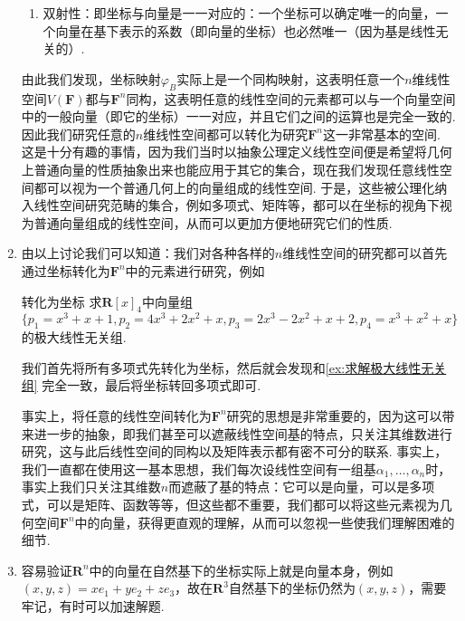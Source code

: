 \begin{enumerate}
\begin{enumerate}
              \item 双射性：即坐标与向量是一一对应的：一个坐标可以确定唯一的向量，一个向量在基下表示的系数（即向量的坐标）也必然唯一（因为基是线性无关的）.
          \end{enumerate}
          由此我们发现，坐标映射$\varphi_B$实际上是一个同构映射，这表明任意一个$n$维线性空间$V(\mathbf{F})$都与$\mathbf{F}^n$同构，这表明任意的线性空间的元素都可以与一个向量空间中的一般向量（即它的坐标）一一对应，并且它们之间的运算也是完全一致的. 因此我们研究任意的$n$维线性空间都可以转化为研究$\mathbf{F}^n$这一非常基本的空间. 这是十分有趣的事情，因为我们当时以抽象公理定义线性空间便是希望将几何上普通向量的性质抽象出来也能应用于其它的集合，现在我们发现任意线性空间都可以视为一个普通几何上的向量组成的线性空间. 于是，这些被公理化纳入线性空间研究范畴的集合，例如多项式、矩阵等，都可以在坐标的视角下视为普通向量组成的线性空间，从而可以更加方便地研究它们的性质.

    \item 由以上讨论我们可以知道：我们对各种各样的$n$维线性空间的研究都可以首先通过坐标转化为$\mathbf{F}^n$中的元素进行研究，例如
          \begin{example}{}{转化为坐标}
              求$\mathbf{R}[x]_4$中向量组$\{p_1=x^3+x+1,p_2=4x^3+2x^2+x,p_3=2x^3-2x^2+x+2,p_4=x^3+x^2+x\}$的极大线性无关组.
          \end{example}
          \begin{solution}
              我们首先将所有多项式先转化为坐标，然后就会发现和\autoref{ex:求解极大线性无关组} 完全一致，最后将坐标转回多项式即可.
          \end{solution}

          事实上，将任意的线性空间转化为$\mathbf{F}^n$研究的思想是非常重要的，因为这可以带来进一步的抽象，即我们甚至可以遮蔽线性空间基的特点，只关注其维数进行研究，这与此后线性空间的同构以及矩阵表示都有密不可分的联系. 事实上，我们一直都在使用这一基本思想，我们每次设线性空间有一组基$\alpha_1,\ldots,\alpha_n$时，事实上我们只关注其维数$n$而遮蔽了基的特点：它可以是向量，可以是多项式，可以是矩阵、函数等等，但这些都不重要，我们都可以将这些元素视为几何空间$\mathbf{F}^n$中的向量，获得更直观的理解，从而可以忽视一些使我们理解困难的细节.

    \item 容易验证$\mathbf{R}^n$中的向量在自然基下的坐标实际上就是向量本身，例如$(x,y,z)=xe_1+ye_2+ze_3$，故在$\mathbf{R}^3$自然基下的坐标仍然为$(x,y,z)$，需要牢记，有时可以加速解题.
\end{enumerate}

